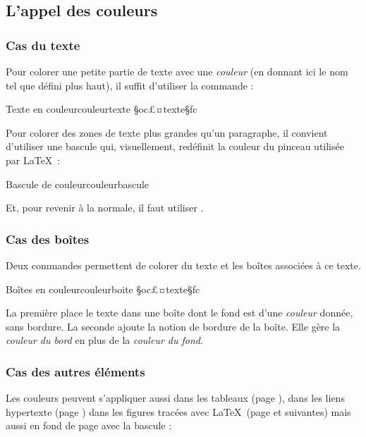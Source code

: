 \subsection{L'appel des couleurs}
\subsubsection{Cas du texte}

Pour colorer une petite partie de texte avec une \emph{couleur} (en donnant ici le nom tel que défini plus haut), il suffit d'utiliser la commande :

\begin{codesimple}{Texte en couleur}{couleurtexte}
\textcolor{§oc£¤couleur§fc}{§oc£¤texte§fc}
\end{codesimple}

Pour colorer des zones de texte plus grandes qu'un paragraphe, il convient d'utiliser une bascule qui, visuellement, redéfinit la couleur du pinceau utilisée par \LaTeX\ :
\begin{codesimple}{Bascule de couleur}{couleurbascule}
\color{§oc£¤couleur§fc}
\end{codesimple}
Et, pour revenir à la normale, il faut utiliser .


\subsubsection{Cas des boîtes}

Deux commandes permettent de colorer du texte et les boîtes associées à ce texte.

\begin{codesimple}{Boîtes en couleur}{couleurboite}
\colorbox{§oc£¤couleur fond§fc}{§oc£¤texte§fc}
\end{codesimple}

La première place le texte dans une boîte dont le fond est d'une \emph{couleur} donnée, sans bordure. La seconde ajoute la notion de bordure de la boîte. Elle gère la \emph{couleur du bord} en plus de la \emph{couleur du fond}.


\subsubsection{Cas des autres éléments}

Les couleurs peuvent s'appliquer aussi dans les tableaux (page \pageref{tableaucouleur}), dans les liens hypertexte (page \pageref{hyperrefcouleur}) dans les figures tracées avec \LaTeX\ (page \pageref{dessincouleur} et suivantes) mais aussi en fond de page avec la bascule :

